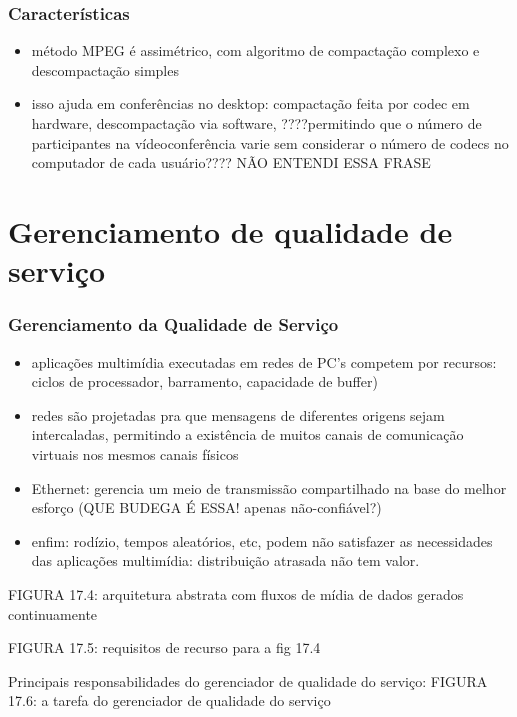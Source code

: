 \documentclass[]{beamer}
\begin{document}
\begin{frame}
  \frametitle{Características}
\begin{itemize}
  \item método MPEG é assimétrico, com algoritmo de compactação complexo e descompactação
simples
  \item isso ajuda em conferências no desktop: compactação feita por codec em hardware, 
descompactação via software, ????permitindo que o número de participantes na
vídeoconferência varie sem considerar o número de 
codecs no computador de cada usuário???? NÃO ENTENDI ESSA FRASE
\end{itemize}
\end{frame}

\section{Gerenciamento de qualidade de serviço}

\begin{frame}
  \frametitle{Gerenciamento da Qualidade de Serviço}
\begin{itemize}
  \item aplicações multimídia executadas em redes de PC's competem por recursos: ciclos 
de processador, barramento, capacidade de buffer)
  \item redes são projetadas pra que mensagens de diferentes origens sejam intercaladas,
permitindo a existência de muitos canais de comunicação virtuais nos mesmos canais físicos
  \item Ethernet: gerencia um meio de transmissão compartilhado na base do melhor esforço
(QUE BUDEGA É ESSA! apenas não-confiável?)
  \item enfim: rodízio, tempos aleatórios, etc, podem não satisfazer as necessidades das
aplicações multimídia: distribuição atrasada não tem valor.
\end{itemize}
\end{frame}

\begin{frame}
FIGURA 17.4: arquitetura abstrata com fluxos de mídia de dados gerados continuamente
\end{frame}

\begin{frame}
FIGURA 17.5: requisitos de recurso para a fig 17.4
\end{frame}

\begin{frame}
Principais responsabilidades do gerenciador de qualidade do serviço:
FIGURA 17.6: a tarefa do gerenciador de qualidade do serviço
\end{frame}
\end{document}
